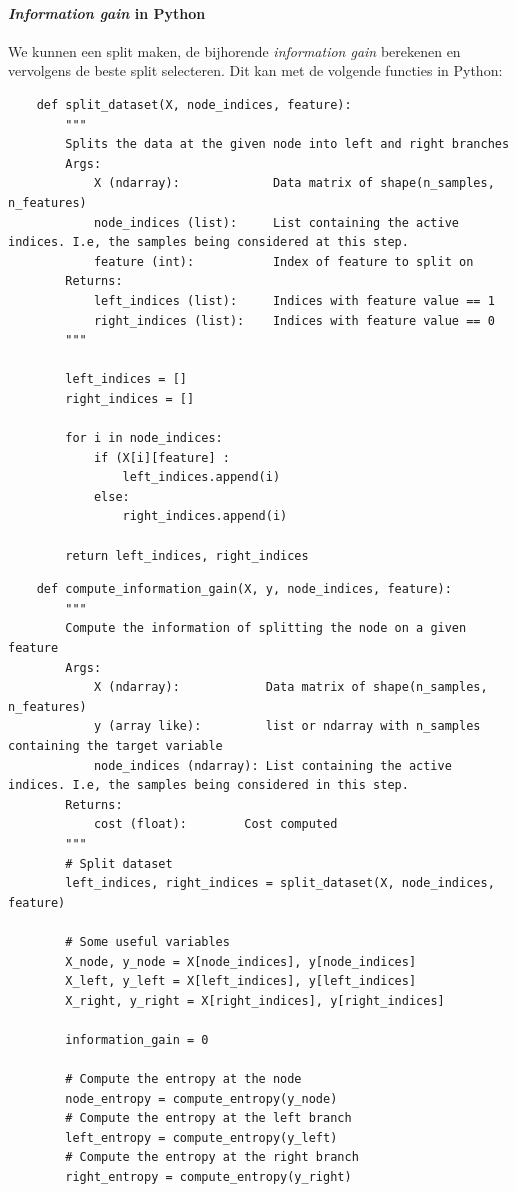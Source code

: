 \paragraph{\textit{Information gain} in Python}

We kunnen een split maken, de bijhorende \textit{information gain} berekenen en vervolgens de beste split selecteren. Dit kan met de volgende functies in Python:

\begin{lstlisting}
	def split_dataset(X, node_indices, feature):
	    """
	    Splits the data at the given node into left and right branches
	    Args:
	        X (ndarray):             Data matrix of shape(n_samples, n_features)
	        node_indices (list):     List containing the active indices. I.e, the samples being considered at this step.
	        feature (int):           Index of feature to split on
	    Returns:
	        left_indices (list):     Indices with feature value == 1
	        right_indices (list):    Indices with feature value == 0
	    """
	
	    left_indices = []
	    right_indices = []
	
	    for i in node_indices:
	        if (X[i][feature] :
	            left_indices.append(i) 
	        else: 
	            right_indices.append(i)
	
	    return left_indices, right_indices
\end{lstlisting}

\begin{lstlisting}
	def compute_information_gain(X, y, node_indices, feature):
	    """
	    Compute the information of splitting the node on a given feature
	    Args:
	        X (ndarray):            Data matrix of shape(n_samples, n_features)
	        y (array like):         list or ndarray with n_samples containing the target variable
	        node_indices (ndarray): List containing the active indices. I.e, the samples being considered in this step.
	    Returns:
	        cost (float):        Cost computed
	    """
	    # Split dataset
	    left_indices, right_indices = split_dataset(X, node_indices, feature)
	
	    # Some useful variables
	    X_node, y_node = X[node_indices], y[node_indices]
	    X_left, y_left = X[left_indices], y[left_indices]
	    X_right, y_right = X[right_indices], y[right_indices]
	
	    information_gain = 0
	
	    # Compute the entropy at the node
	    node_entropy = compute_entropy(y_node)
	    # Compute the entropy at the left branch
	    left_entropy = compute_entropy(y_left)
	    # Compute the entropy at the right branch
	    right_entropy = compute_entropy(y_right)
\end{lstlisting}

